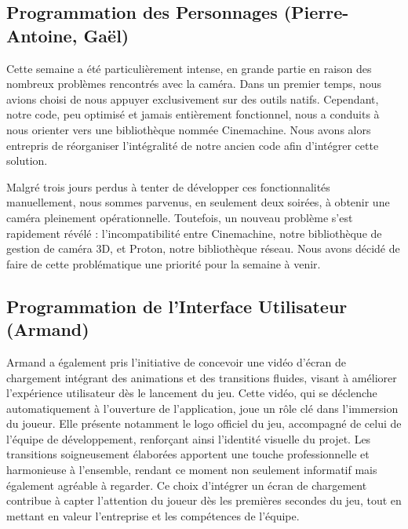 \documentclass{report}
\begin{document}
\subsection*{Programmation des Personnages (Pierre-Antoine, Gaël)}

Cette semaine a été particulièrement intense, en grande partie en raison des nombreux problèmes rencontrés avec la caméra. Dans un premier temps, nous avions choisi de nous appuyer exclusivement sur des outils natifs. Cependant, notre code, peu optimisé et jamais entièrement fonctionnel, nous a conduits à nous orienter vers une bibliothèque nommée Cinemachine. Nous avons alors entrepris de réorganiser l'intégralité de notre ancien code afin d'intégrer cette solution.

Malgré trois jours perdus à tenter de développer ces fonctionnalités manuellement, nous sommes parvenus, en seulement deux soirées, à obtenir une caméra pleinement opérationnelle. Toutefois, un nouveau problème s'est rapidement révélé : l'incompatibilité entre Cinemachine, notre bibliothèque de gestion de caméra 3D, et Proton, notre bibliothèque réseau. Nous avons décidé de faire de cette problématique une priorité pour la semaine à venir.

\newpage %

\subsection*{Programmation de l'Interface Utilisateur (Armand)}
Armand a également pris l’initiative de concevoir une vidéo d’écran de chargement intégrant des animations et des transitions fluides, visant à améliorer l'expérience utilisateur dès le lancement du jeu. Cette vidéo, qui se déclenche automatiquement à l'ouverture de l'application, joue un rôle clé dans l’immersion du joueur. Elle présente notamment le logo officiel du jeu, accompagné de celui de l’équipe de développement, renforçant ainsi l’identité visuelle du projet. Les transitions soigneusement élaborées apportent une touche professionnelle et harmonieuse à l’ensemble, rendant ce moment non seulement informatif mais également agréable à regarder. Ce choix d’intégrer un écran de chargement contribue à capter l’attention du joueur dès les premières secondes du jeu, tout en mettant en valeur l’entreprise et les compétences de l’équipe.
\end{document}
